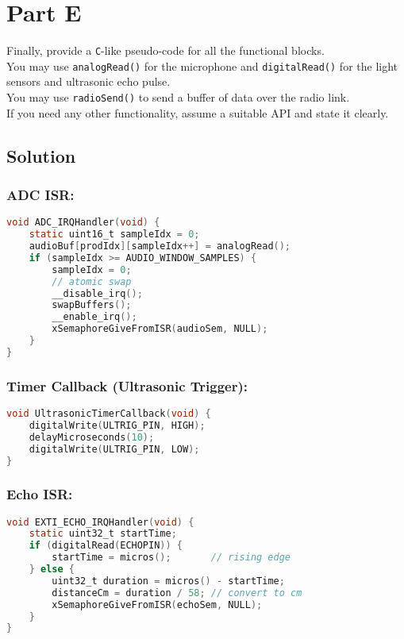 \section*{Part E}

Finally, provide a \texttt{C}-like pseudo-code for all the functional blocks. \\
You may use \texttt{analogRead\@()} for the microphone and \texttt{digitalRead\@()} for the light sensors and ultrasonic echo pulse. \\
You may use \texttt{radioSend\@()} to send a buffer of data over the radio link. \\
If you need any other functionality, assume a suitable API and state it clearly.

\subsection*{Solution}

\subsubsection*{ADC ISR:}
\vspace*{-0.5em}
\begin{lstlisting}[language=C]
void ADC_IRQHandler(void) {
    static uint16_t sampleIdx = 0;
    audioBuf[prodIdx][sampleIdx++] = analogRead();
    if (sampleIdx >= AUDIO_WINDOW_SAMPLES) {
        sampleIdx = 0;
        // atomic swap
        __disable_irq();
        swapBuffers();
        __enable_irq();
        xSemaphoreGiveFromISR(audioSem, NULL);
    }
}
\end{lstlisting}

\vspace*{-1em}
\subsubsection*{Timer Callback (Ultrasonic Trigger):}
\vspace*{-0.5em}
\begin{lstlisting}[language=C]
void UltrasonicTimerCallback(void) {
    digitalWrite(ULTRIG_PIN, HIGH);
    delayMicroseconds(10);
    digitalWrite(ULTRIG_PIN, LOW);
}
\end{lstlisting}

\newpage
\subsubsection*{Echo ISR:}
\vspace*{-0.5em}
\begin{lstlisting}[language=C]
void EXTI_ECHO_IRQHandler(void) {
    static uint32_t startTime;
    if (digitalRead(ECHOPIN)) {
        startTime = micros();       // rising edge
    } else {
        uint32_t duration = micros() - startTime;
        distanceCm = duration / 58; // convert to cm
        xSemaphoreGiveFromISR(echoSem, NULL);
    }
}
\end{lstlisting}

